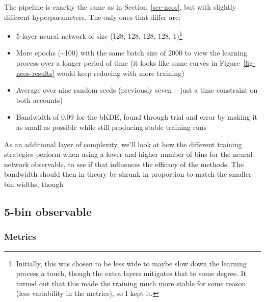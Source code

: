\documentclass[
  11pt,
  numbers=noendperiod]{book}
\providecommand{\tightlist}{%
  \setlength{\itemsep}{0pt}\setlength{\parskip}{0pt}}\usepackage{longtable,booktabs,array}
\begin{document}
The pipeline is exactly the same as in Section~\ref{sec-neos}, but with
slightly different hyperparameters. The only ones that differ are:

\begin{itemize}
\tightlist
\item
  5-layer neural network of size (128, 128, 128, 128, 1)\footnote{Initially,
    this was chosen to be less wide to maybe slow down the learning
    process a touch, though the extra layers mitigates that to some
    degree. It turned out that this made the training much more stable
    for some reason (less variability in the metrics), so I kept it.}
\item
  More epochs (\textasciitilde100) with the same batch size of 2000 to
  view the learning process over a longer period of time (it looks like
  some curves in Figure~\ref{fig-neos-results} would keep reducing with
  more training)
\item
  Average over nine random seeds (previously seven -- just a time
  constraint on both accounts)
\item
  Bandwidth of 0.09 for the bKDE, found through trial and error by
  making it as small as possible while still producing stable training
  runs
\end{itemize}

As an additional layer of complexity, we'll look at how the different
training strategies perform when using a lower and higher number of bins
for the neural network observable, to see if that influences the
efficacy of the methods. The bandwidth should then in theory be shrunk
in proportion to match the smaller bin widths, though

\hypertarget{bin-observable}{%
\subsection{5-bin observable}\label{bin-observable}}

\hypertarget{metrics}{%
\subsubsection*{Metrics}\label{metrics}}
\end{document}
